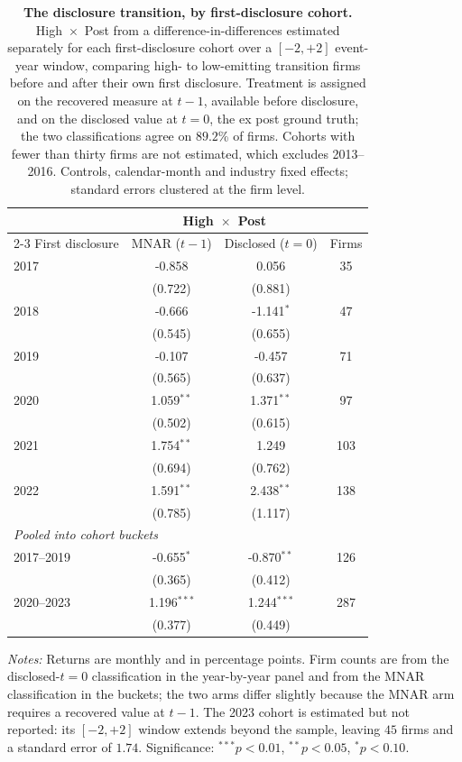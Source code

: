 \documentclass[a4paper,12pt]{article}
\begin{document}
\begin{table}[htbp]
\footnotesize\centering
\caption{\textbf{The disclosure transition, by first-disclosure cohort.}
High~$\times$~Post from a difference-in-differences estimated separately for each
first-disclosure cohort over a $[-2,+2]$ event-year window, comparing high- to
low-emitting transition firms before and after their own first disclosure.
Treatment is assigned on the recovered measure at $t-1$, available before
disclosure, and on the disclosed value at $t=0$, the ex post ground truth; the
two classifications agree on $89.2$\% of firms. Cohorts with fewer than thirty
firms are not estimated, which excludes 2013--2016. Controls, calendar-month and
industry fixed effects; standard errors clustered at the firm level.}
\label{tab:returns_did_cohort_year}
\begin{tabular}{lccc}
\toprule
 & \multicolumn{2}{c}{High~$\times$~Post} & \\
\cmidrule(lr){2-3}
First disclosure & MNAR ($t-1$) & Disclosed ($t=0$) & Firms \\
\midrule
2017 & -0.858 & 0.056 & 35 \\
     & (0.722) & (0.881) & \\
2018 & -0.666 & -1.141$^{*}$ & 47 \\
     & (0.545) & (0.655) & \\
2019 & -0.107 & -0.457 & 71 \\
     & (0.565) & (0.637) & \\
2020 & 1.059$^{**}$ & 1.371$^{**}$ & 97 \\
     & (0.502) & (0.615) & \\
2021 & 1.754$^{**}$ & 1.249 & 103 \\
     & (0.694) & (0.762) & \\
2022 & 1.591$^{**}$ & 2.438$^{**}$ & 138 \\
     & (0.785) & (1.117) & \\
\midrule
\multicolumn{4}{l}{\emph{Pooled into cohort buckets}} \\[2pt]
2017--2019 & -0.655$^{*}$ & -0.870$^{**}$ & 126 \\
     & (0.365) & (0.412) & \\
2020--2023 & 1.196$^{***}$ & 1.244$^{***}$ & 287 \\
     & (0.377) & (0.449) & \\
\bottomrule
\end{tabular}
\begin{flushleft}\footnotesize
\textit{Notes:} Returns are monthly and in percentage points. Firm counts are
from the disclosed-$t=0$ classification in the year-by-year panel and from the
MNAR classification in the buckets; the two arms differ slightly because the
MNAR arm requires a recovered value at $t-1$. The 2023 cohort is estimated but
not reported: its $[-2,+2]$ window extends beyond the sample, leaving $45$ firms
and a standard error of $1.74$. Significance: $^{***}p<0.01$, $^{**}p<0.05$,
$^{*}p<0.10$.
\end{flushleft}
\end{table}
\end{document}
